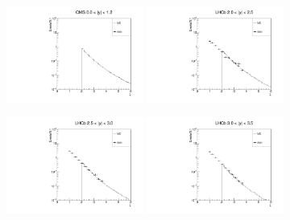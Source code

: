 \documentclass{article}
\begin{document}
\clearpage


\begin{figure}[h!]
\centering
\includegraphics[width = 0.4\textwidth]{plots/xi_CMS.pdf}
\includegraphics[width = 0.4\textwidth]{plots/xi_LHCb_y1.pdf}

\includegraphics[width = 0.4\textwidth]{plots/xi_LHCb_y2.pdf}
\includegraphics[width = 0.4\textwidth]{plots/xi_LHCb_y3.pdf}


\end{figure}
\end{document}
